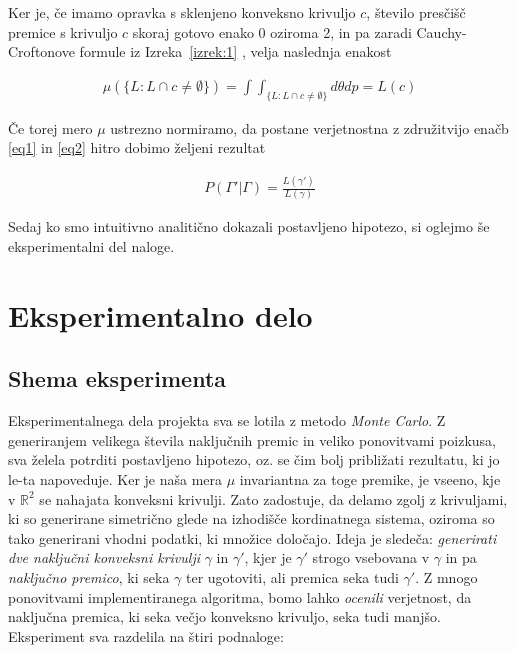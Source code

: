 \documentclass[a4paper]{article}
\begin{document}
Ker je, če imamo opravka s sklenjeno konveksno krivuljo $c$, število presčišč premice s krivuljo $c$ skoraj gotovo enako 0 oziroma 2, in pa zaradi Cauchy-Croftonove formule iz Izreka~\ref{izrek:1} , velja naslednja enakost

\begin{align}
\mu(\{L:L \cap c \ne \emptyset \}) = \int \int _{\{L:L \cap c \ne \emptyset \}} d\theta dp = L(c) \label{eq2}
\end{align}

Če torej mero $\mu$ ustrezno normiramo, da postane verjetnostna z združitvijo enačb  \ref{eq1} in \ref{eq2} hitro dobimo željeni rezultat

\begin{align}
P(\Gamma' | \Gamma) = \frac{L(\gamma')}{L(\gamma)}
\end{align}

Sedaj ko smo intuitivno analitično dokazali postavljeno hipotezo, si oglejmo še eksperimentalni del naloge.







\section{Eksperimentalno delo}

\subsection{Shema eksperimenta}

Eksperimentalnega dela projekta sva se lotila z metodo \textit{Monte Carlo}. Z generiranjem velikega števila naključnih premic in veliko ponovitvami poizkusa, sva želela potrditi postavljeno hipotezo, oz. se čim bolj približati rezultatu, ki jo le-ta napoveduje. Ker je naša mera $\mu$ invariantna za toge premike, je vseeno, kje v $\mathbb{R}^2$ se nahajata konveksni krivulji. Zato zadostuje, da delamo zgolj z krivuljami, ki so generirane simetrično glede na izhodišče kordinatnega sistema, oziroma so tako generirani vhodni podatki, ki množice določajo.  Ideja je sledeča: \textit{generirati dve naključni konveksni krivulji} $\gamma$ in $\gamma'$, kjer je $\gamma'$ strogo vsebovana v $\gamma$ in pa \textit{naključno premico}, ki seka $\gamma$ ter ugotoviti, ali premica seka tudi $\gamma'$. Z mnogo ponovitvami implementiranega algoritma, bomo lahko \textit{ocenili} verjetnost, da naključna premica, ki seka večjo konveksno krivuljo, seka tudi manjšo. Eksperiment sva razdelila na štiri podnaloge:
\end{document}
